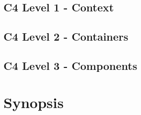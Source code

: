 \subsection{C4 Level 1 - Context}
\label{subsec:design:architecture:context}

\subsection{C4 Level 2 - Containers}
\label{subsec:design:architecture:containers}

\subsection{C4 Level 3 - Components}
\label{subsec:design:architecture:components}

\section{Synopsis}
\label{sec:design:synopsis}

